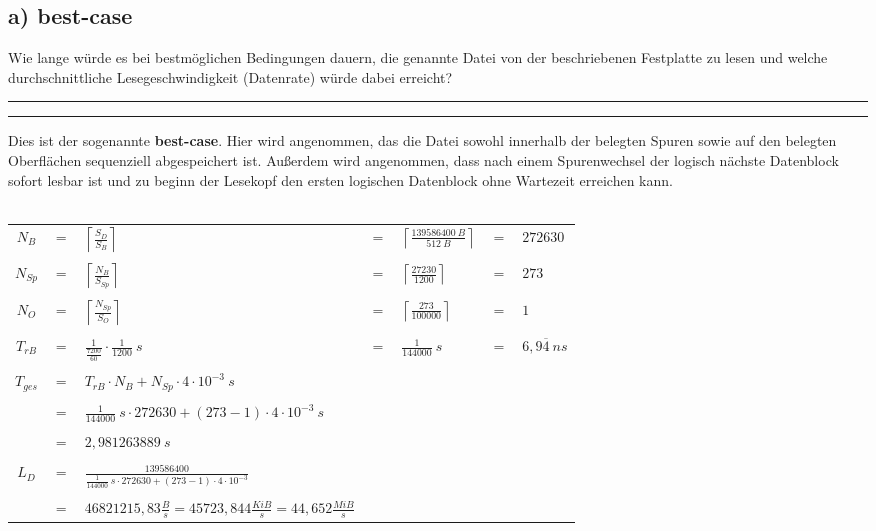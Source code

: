 \documentclass{ti2}
\makeatletter
\renewenvironment{quote}{%
	\vskip 10\p@
	\parindent\z@
	\tcolorbox[
	breakable, sharp corners,
	boxrule=\z@, boxsep=\z@,
	left=\z@, right=\z@,
	top=\z@, bottom=\z@,
	colback=sx-yellow
	]
	{\color{sx-orange}\d@ublerule}
	\vskip 5\p@
	\list{}{\rightmargin\leftmargin}%
	\item\relax
}{%
\endlist
{\color{sx-orange}\d@ublerule}
\endtcolorbox
\vskip 5\p@
}
\def\d@ublerule{\hrule\@width\hsize\kern 1.5\p@\hrule\@width\hsize}
\makeatother
\begin{document}
\subsection*{a) best-case}
\begin{quote}
Wie lange würde es bei bestmöglichen Bedingungen dauern, die genannte Datei von der beschriebenen Festplatte zu lesen und welche durchschnittliche Lesegeschwindigkeit (Datenrate) würde dabei erreicht?
\end{quote}
Dies ist der sogenannte \textbf{best-case}. Hier wird angenommen, das die Datei sowohl innerhalb der belegten Spuren sowie auf den belegten Oberflächen sequenziell abgespeichert ist. Außerdem wird angenommen, dass nach einem Spurenwechsel der logisch nächste Datenblock sofort lesbar ist und zu beginn der Lesekopf den ersten logischen Datenblock ohne Wartezeit erreichen kann.\\\\
\begin{tabular}{cclclcl}
$N_B$ & $=$ & $\left\lceil\frac{S_D}{S_B}\right\rceil$ & $=$ & $\left\lceil\frac{139586400~B}{512~B}\right\rceil$ & $=$ & $272630$ \\ \\

$N_{Sp}$ & $=$ & $\left\lceil\frac{N_B}{S_{Sp}}\right\rceil$ & $=$ & $\left\lceil\frac{27230}{1200}\right\rceil$ & $=$ & $273$ \\ \\

$N_O$ & $=$ & $\left\lceil\frac{N_{Sp}}{S_O}\right\rceil$ & $=$ & $\left\lceil\frac{273}{100000}\right\rceil$ & $=$ & $1$ \\ \\

$T_{rB}$ & $=$ & $\frac{1}{\frac{7200}{60}}\cdot\frac{1}{1200}~s$ & $=$ & $\frac{1}{144000}~s$ & $=$ & $6,9\overline{4}~ns$ \\ \\

$T_{ges}$ & $=$ & $T_{rB} \cdot N_B + N_{Sp}\cdot 4 \cdot 10^{-3}~s$\\ \\
& $=$ & $\frac{1}{144000}~s\cdot 272630 + (273 - 1) \cdot 4\cdot10^{-3}~s$\\ \\
& $=$ & $2,981263889~s$\\\\

$L_D$ & $=$ & $\frac{139586400}{\frac{1}{144000}~s\cdot 272630 + (273 - 1) \cdot 4\cdot10^{-3}}$ \\ \\
& $=$ & $46821215,83\frac{B}{s}=45723,844\frac{KiB}{s}=44,652\frac{MiB}{s}$
\end{tabular}
\end{document}
